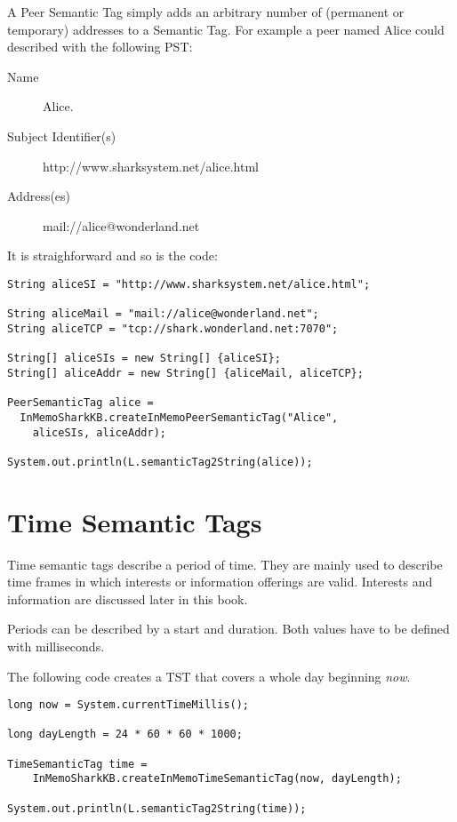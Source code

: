 A Peer Semantic Tag simply adds an arbitrary number of (permanent or temporary) addresses to a Semantic Tag. For example a peer named Alice could described with the following PST:

\begin{description}
    \item[Name] Alice.
    \item[Subject Identifier(s)] http://www.sharksystem.net/alice.html
    \item[Address(es)] mail://alice@wonderland.net
\end{description}

It is straighforward and so is the code:

\begin{verbatim}
String aliceSI = "http://www.sharksystem.net/alice.html";

String aliceMail = "mail://alice@wonderland.net";
String aliceTCP = "tcp://shark.wonderland.net:7070";

String[] aliceSIs = new String[] {aliceSI};
String[] aliceAddr = new String[] {aliceMail, aliceTCP};

PeerSemanticTag alice =
  InMemoSharkKB.createInMemoPeerSemanticTag("Alice",
    aliceSIs, aliceAddr);

System.out.println(L.semanticTag2String(alice));
\end{verbatim}

\section{Time Semantic Tags}
Time semantic tags describe a period of time. They are mainly used to describe time frames in which interests or information offerings are valid. Interests and information are discussed later in this book.

Periods can be described by a start and duration. Both values have to be defined with milliseconds.

The following code creates a TST that covers a whole day beginning {\it now}.

\begin{verbatim}
long now = System.currentTimeMillis();

long dayLength = 24 * 60 * 60 * 1000;

TimeSemanticTag time =
    InMemoSharkKB.createInMemoTimeSemanticTag(now, dayLength);

System.out.println(L.semanticTag2String(time));
\end{verbatim}

